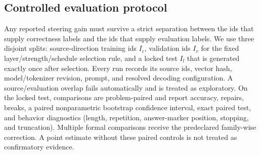 \begin{center}
\end{center}

\subsection{Controlled evaluation protocol}
\label{sec:crosssteer-no-leakage}

Any reported steering gain must survive a strict separation between the ids
that supply correctness labels and the ids that supply evaluation labels.  We use
three disjoint splits: source-direction training ids $I_c$, validation ids $I_v$
for the fixed layer/strength/schedule selection rule, and a locked test $I_l$
that is generated exactly once after selection.  Every run records its source
ids, vector hash, model/tokenizer revision, prompt, and resolved decoding
configuration.  A source/evaluation overlap fails automatically and is treated
as exploratory.  On the locked test, comparisons are problem-paired and report
accuracy, repairs, breaks, a paired nonparametric bootstrap confidence interval,
exact paired test, and behavior diagnostics (length, repetition, answer-marker
position, stopping, and truncation).  Multiple formal comparisons receive the
predeclared family-wise correction.  A point estimate without these paired controls is not treated as confirmatory evidence.
